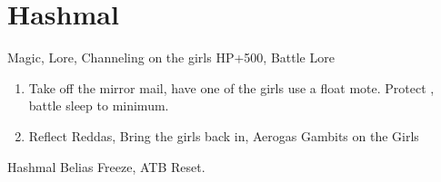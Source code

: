 \chapter{Hashmal}

\begin{liscense}
Magic, Lore, Channeling on the girls
\vaan HP+500, Battle Lore
\end{liscense}
\begin{enumerate}
\item Take off the mirror mail, have one of the girls use a float mote. Protect \vaan, battle sleep to minimum.
\item Reflect Reddas, Bring the girls back in, Aerogas Gambits on the Girls
\end{enumerate}
\begin{battle}{Hashmal}
Belias Freeze, ATB Reset.
\end{battle}